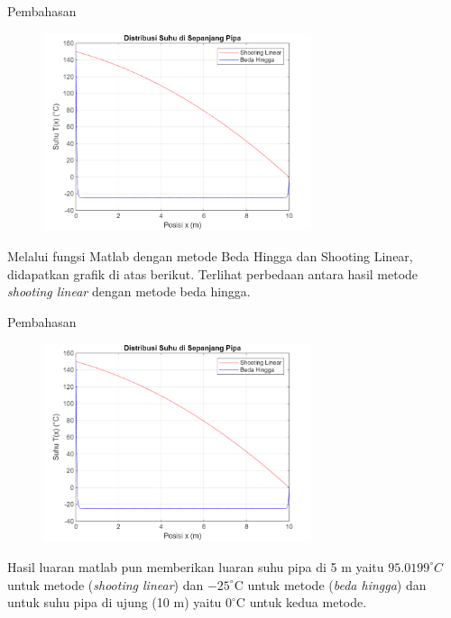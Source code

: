 \documentclass[xcolor={dvipsnames}, 9pt]{beamer}
\begin{document}
	\begin{frame}{Pembahasan}
		\begin{figure}[h] 
			\centering
			\includegraphics[width=0.7\textwidth]{Pipa.png}
		\end{figure}
		Melalui fungsi Matlab dengan metode Beda Hingga dan Shooting Linear, didapatkan grafik di atas berikut. Terlihat perbedaan antara hasil metode \textit{shooting linear} dengan metode beda hingga.
		
	\end{frame}
	
	\begin{frame}{Pembahasan}
		\begin{figure}[h] 
			\centering
			\includegraphics[width=0.7\textwidth]{Pipa.png}
		\end{figure}
		Hasil luaran matlab pun memberikan luaran suhu pipa di 5 m yaitu $95.0199^{\circ}C$ untuk metode
		(\textit{shooting linear}) dan $-25^{\circ}$C untuk metode (\textit{beda hingga}) 
		dan untuk suhu pipa di ujung (10 m) yaitu $0^{\circ}$C untuk kedua metode.
	\end{frame}
	
\end{document}
